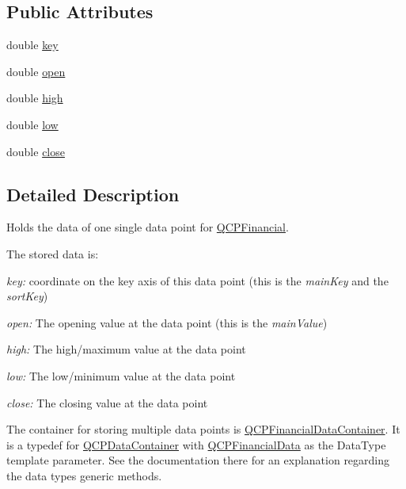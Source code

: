 \subsection*{Public Attributes}
\begin{DoxyCompactItemize}
\item 
double \mbox{\hyperlink{class_q_c_p_financial_data_a18bc92126f28c214b05b0161e5f5958b}{key}}
\item 
double \mbox{\hyperlink{class_q_c_p_financial_data_a3059e1e1fbcb9fd243fde0450f238032}{open}}
\item 
double \mbox{\hyperlink{class_q_c_p_financial_data_a299a4b241296fb6cd1baf5ab03f7126a}{high}}
\item 
double \mbox{\hyperlink{class_q_c_p_financial_data_aecce0fb45a115e3f3a25eea78491ac16}{low}}
\item 
double \mbox{\hyperlink{class_q_c_p_financial_data_a45e9b96944c4a08ea6c82a72d3d22df2}{close}}
\end{DoxyCompactItemize}


\subsection{Detailed Description}
Holds the data of one single data point for \mbox{\hyperlink{class_q_c_p_financial}{Q\+C\+P\+Financial}}. 

The stored data is\+: \begin{DoxyItemize}
\item {\itshape key\+:} coordinate on the key axis of this data point (this is the {\itshape main\+Key} and the {\itshape sort\+Key}) \item {\itshape open\+:} The opening value at the data point (this is the {\itshape main\+Value}) \item {\itshape high\+:} The high/maximum value at the data point \item {\itshape low\+:} The low/minimum value at the data point \item {\itshape close\+:} The closing value at the data point\end{DoxyItemize}
The container for storing multiple data points is \mbox{\hyperlink{qcustomplot_8h_ae36e482e04f19a54782f01ab38c354a6}{Q\+C\+P\+Financial\+Data\+Container}}. It is a typedef for \mbox{\hyperlink{class_q_c_p_data_container}{Q\+C\+P\+Data\+Container}} with \mbox{\hyperlink{class_q_c_p_financial_data}{Q\+C\+P\+Financial\+Data}} as the Data\+Type template parameter. See the documentation there for an explanation regarding the data type\textquotesingle{}s generic methods.

